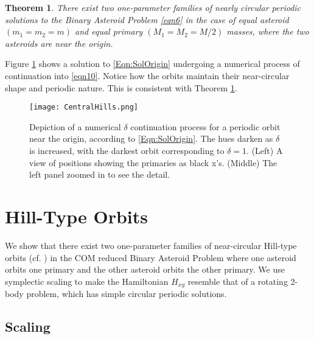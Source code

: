 \documentclass[12pt]{article}
\newtheorem{theorem}{Theorem}
\begin{document}
\begin{theorem}\label{Thm:CentralHills}
There exist two one-parameter families of nearly circular periodic solutions to the Binary Asteroid Problem \eqref{eqn6} in the case of equal asteroid $(m_1 = m_2 = m)$ and equal primary $(M_1 = M_2 = M/2)$ masses, where the two asteroids are near the origin.
\end{theorem}

Figure \ref{fig:CentralHills} shows a solution to \eqref{Eqn:SolOrigin} undergoing a numerical process of continuation into \eqref{eqn10}. Notice how the orbits maintain their near-circular shape and periodic nature. This is consistent with Theorem \ref{Thm:CentralHills}.

\begin{figure}[ht]%
\centering
\texttt{[image: CentralHills.png]}
\caption[Central-Hill continuation]{Depiction of a numerical $\delta$ continuation process for a periodic orbit near the origin, according to \eqref{Eqn:SolOrigin}. The hues darken as $\delta$ is increased, with the darkest orbit corresponding to $\delta = 1$. (Left) A view of positions showing the primaries as black x's. (Middle) The left panel zoomed in to see the detail.}\label{fig:CentralHills}
\end{figure}



\section{Hill-Type Orbits}
We show that there exist two one-parameter families of near-circular Hill-type orbits (cf. \cite{Stoica,meyerOffin}) in the COM reduced Binary Asteroid Problem where one asteroid orbits one primary and the other asteroid orbits the other primary.
We use symplectic scaling to make the Hamiltonian $H_{xy}$ resemble that of a rotating 2-body problem, which has simple circular periodic solutions.

\subsection{Scaling}
\end{document}
